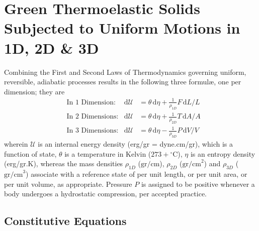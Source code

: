 \section{Green Thermoelastic Solids Subjected to Uniform Motions in 1D, 2D \& 3D}
\label{secUniformCE}

Combining the First and Second Laws of Thermo\-dynamics governing uniform, reversible, adiabatic processes results in the following three formul\ae, one per dimension; they are
\begin{subequations}
    \label{thermoelasticLaws}
    \begin{align}
    \mbox{} & \text{In 1 Dimension:} & 
    \mathrm{d}\mathcal{U} & = \theta \, \mathrm{d} \eta +
    \tfrac{1}{\rho_{1D}} F \, \mathrm{d}L / L
    \label{thermoelastic1Dlaw} \\
    \mbox{} & \text{In 2 Dimensions:} &
    \mathrm{d}\mathcal{U} & = \theta \, \mathrm{d} \eta + 
    \tfrac{1}{\rho_{2D}} T \, \mathrm{d}A / \! A
    \label{thermoelastic2Dlaw} \\
    \mbox{} & \text{In 3 Dimensions:} &
    \mathrm{d}\mathcal{U} & = \theta \, \mathrm{d} \eta - 
    \tfrac{1}{\rho_{3D}} P \, \mathrm{d}V \! / V \!
    \label{thermoelastic3Dlaw}
    \end{align}
\end{subequations}
wherein $\mathcal{U}$ is an internal energy density (erg/gr = dyne.cm/gr), which is a function of state, $\theta$ is a temperature in Kelvin ($273 + \mbox{}^{\circ}$C), $\eta$ is an entropy density (erg/gr.K), whereas the mass densities $\rho_{1D}$ ($\text{gr/cm}$), $\rho_{2D}$ ($\text{gr/cm}^2$) and $\rho_{3D}$ ($\text{gr/cm}^3$) associate with a reference state of per unit length, or per unit area, or per unit volume, as appropriate.  Pressure $P$ is assigned to be positive whenever a body undergoes a hydro\-static compression, per accepted practice.

\subsection{Constitutive Equations}

